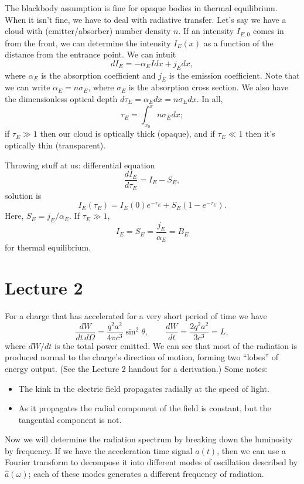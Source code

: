 \documentclass[../a122main.tex]{subfiles}
\begin{document}
The blackbody assumption is fine for opaque bodies in thermal equilibrium.
When it isn't fine, we have to deal with radiative transfer.
Let's say we have a cloud with (emitter/absorber) number density $n$.
If an intensity $I_{E,0}$ comes in from the front, we can determine the intensity $I_E(x)$ as a function of the distance from the entrance point.
We can intuit
\[ dI_E = -\alpha_E I dx + j_E dx, \]
where $\alpha_E$ is the absorption coefficient and $j_E$ is the emission coefficient.
Note that we can write $\alpha_E = n \sigma_E$, where $\sigma_E$ is the absorption cross section.
We also have the dimensionless optical depth $d\tau_E = \alpha_E dx = n \sigma_E dx$.
In all,
\[ \tau_E = \int_{x_0}^{x} n \sigma_E dx; \]
if $\tau_E \gg 1$ then our cloud is optically thick (opaque), and if $\tau_E \ll 1$ then it's optically thin (transparent).

Throwing stuff at us: differential equation
\[ \frac{dI_E}{d\tau_E} = I_E - S_E, \]
solution is
\[ I_E(\tau_E) = I_E(0) e^{-\tau_E} + S_E(1 - e^{-\tau_E}). \]
Here, $S_E = j_E / \alpha_E$.
If $\tau_E \gg 1$,
\[ I_E = S_E = \frac{j_E}{\alpha_E} = B_E \]
for thermal equilibrium.

\section{Lecture 2}
For a charge that has accelerated for a very short period of time we have
\[ \frac{dW}{dt \, d \Omega} = \frac{q^2 a^2}{4\pi c^3} \sin^2 \theta, \qquad \frac{dW}{dt} = \frac{2q^2 a^2}{3c^3} = L, \]
where $dW / dt$ is the total power emitted.
We can see that most of the radiation is produced normal to the charge's direction of motion, forming two ``lobes'' of energy output.
(See the Lecture 2 handout for a derivation.)
Some notes:
\begin{itemize}[topsep=0pt]
    \item The kink in the electric field propagates radially at the speed of light.
    \item As it propagates the radial component of the field is constant, but the tangential component is not.
\end{itemize}

Now we will determine the radiation spectrum by breaking down the luminosity by frequency.
If we have the acceleration time signal $a(t)$, then we can use a Fourier transform to decompose it into different modes of oscillation described by $\hat a(\omega)$; each of these modes generates a different frequency of radiation.
\end{document}
